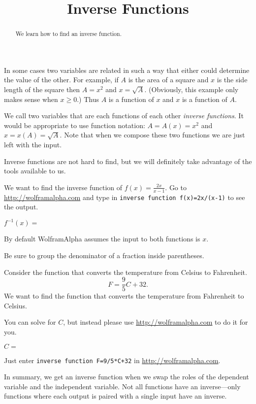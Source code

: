 \documentclass{ximera}
\title{Inverse Functions}
\begin{document}
\begin{abstract}
We learn how to find an inverse function.
\end{abstract}
\maketitle

In some cases two variables are related in such a way that either could determine the value of the other. For example, if $A$ is the area of a square and $x$ is the side length of the square then $A=x^2$ and $x=\sqrt{A}$. (Obviously, this example only makes sense when $x\geq 0$.) Thus $A$ is a function of $x$ and $x$ is a function of $A$.

We call two variables that are each functions of each other \emph{inverse functions}. It would be appropriate to use function notation: $A=A(x)=x^2$ and $x=x(A)=\sqrt{A}$. Note that when we compose these two functions we are just left with the input. 

Inverse functions are not hard to find, but we will definitely take advantage of the tools available to us. 

\begin{question}
We want to find the inverse function of $f(x)=\frac{2x}{x-1}$.
Go to \href{http://wolframalpha.com}{http://wolframalpha.com} and type in \verb|inverse function f(x)=2x/(x-1)| to see the output.

$f^{-1}(x)=$ 
\begin{hint}
By default WolframAlpha assumes the input to both functions is $x$.
\end{hint}
\begin{hint}
Be sure to group the denominator of a fraction inside parentheses.
\end{hint}

\end{question}



\begin{question}
Consider the function that converts the temperature from Celsius to Fahrenheit. 
\[
F=\frac{9}{5}C+32.
\]
We want to find the function that converts the temperature from Fahrenheit to Celsius.

You can solve for $C$, but instead please use \href{http://wolframalpha.com}{http://wolframalpha.com} to do it for you.


$C=$ 
\begin{hint}
Just enter \verb|inverse function F=9/5*C+32| in \href{http://wolframalpha.com}{http://wolframalpha.com}.
\end{hint}


In summary, we get an inverse function when we swap the roles of the dependent variable and the independent variable. Not all functions have an inverse---only functions where each output is paired with a single input have an inverse.
\end{question}
\end{document}
